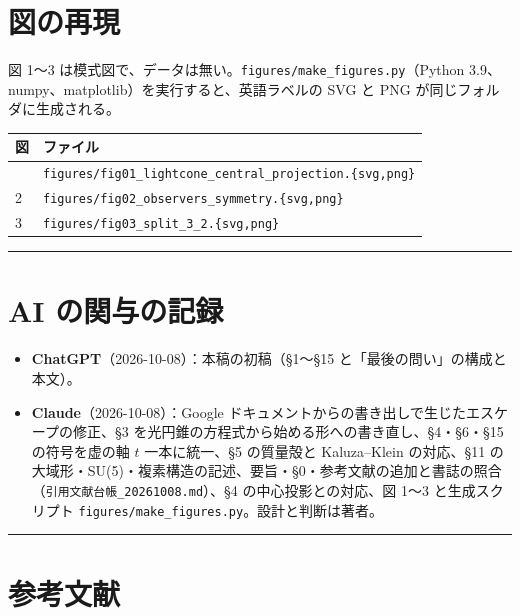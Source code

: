 \documentclass[
  a4paper,
]{ltjsarticle}
\newcounter{none} %
\providecommand{\tightlist}{%
  \setlength{\itemsep}{0pt}\setlength{\parskip}{0pt}}
\begin{document}
\section{図の再現}\label{ux56f3ux306eux518dux73fe}

図 1〜3
は模式図で、データは無い。\texttt{figures/make\_figures.py}（Python
3.9、numpy、matplotlib）を実行すると、英語ラベルの SVG と PNG
が同じフォルダに生成される。

{\def\LTcaptype{none} %
\begin{longtable}[]{@{}ll@{}}
\toprule\noalign{}
図 & ファイル \\
\midrule\noalign{}
\endhead
\bottomrule\noalign{}
\endlastfoot
1 &
\texttt{figures/fig01\_lightcone\_central\_projection.\{svg,png\}} \\
2 & \texttt{figures/fig02\_observers\_symmetry.\{svg,png\}} \\
3 & \texttt{figures/fig03\_split\_3\_2.\{svg,png\}} \\
\end{longtable}
}

\begin{center}\rule{0.5\linewidth}{0.5pt}\end{center}

\section{AI の関与の記録}\label{ai-ux306eux95a2ux4e0eux306eux8a18ux9332}

\begin{itemize}
\tightlist
\item
  \textbf{ChatGPT}（2026-10-08）：本稿の初稿（§1〜§15
  と「最後の問い」の構成と本文）。
\item
  \textbf{Claude}（2026-10-08）：Google
  ドキュメントからの書き出しで生じたエスケープの修正、§3
  を光円錐の方程式から始める形への書き直し、§4・§6・§15 の符号を虚の軸
  \(t\) 一本に統一、§5 の質量殻と Kaluza--Klein の対応、§11
  の大域形・SU(5)・複素構造の記述、要旨・§0・参考文献の追加と書誌の照合（\texttt{引用文献台帳\_20261008.md}）、§4
  の中心投影との対応、図 1〜3 と生成スクリプト
  \texttt{figures/make\_figures.py}。設計と判断は著者。
\end{itemize}

\begin{center}\rule{0.5\linewidth}{0.5pt}\end{center}

\section{参考文献}\label{ux53c2ux8003ux6587ux732e}
\end{document}
